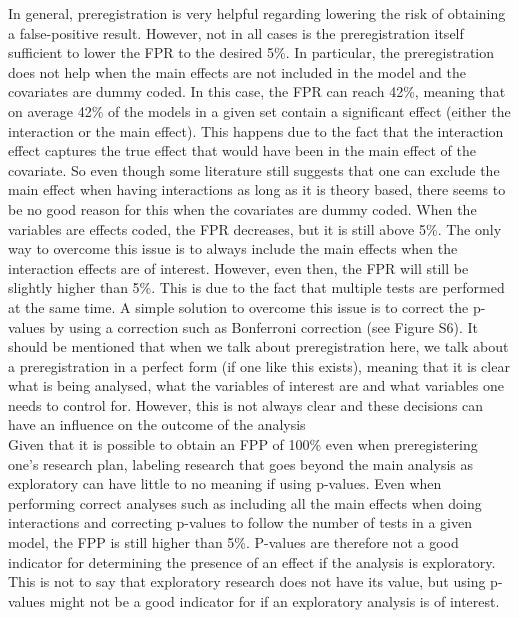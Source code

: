 In general, preregistration is very helpful regarding lowering the risk of obtaining a false-positive result. However, not in all cases is the preregistration itself sufficient to lower the FPR to the desired 5\%. In particular, the preregistration does not help when the main effects are not included in the model and the covariates are dummy coded. In this case, the FPR can reach 42\%, meaning that on average 42\% of the models in a given set contain a significant effect (either the interaction or the main effect). This happens due to the fact that the interaction effect captures the true effect that would have been in the main effect of the covariate. So even though some literature still suggests that one can exclude the main effect when having interactions as long as it is theory based, there seems to be no good reason for this when the covariates are dummy coded. When the variables are effects coded, the FPR decreases, but it is still above 5\%. The only way to overcome this issue is to always include the main effects when the interaction effects are of interest. However, even then, the FPR will still be slightly higher than 5\%. This is due to the fact that multiple tests are performed at the same time. A simple solution to overcome this issue is to correct the p-values by  using a correction such as Bonferroni correction \citep{dunn1961multiple} (see Figure S6).
It should be mentioned that when we talk about preregistration here, we talk about a preregistration in a perfect form (if one like this exists), meaning that it is clear what is being analysed, what the variables of interest are and what variables one needs to control for. However, this is not always clear and these decisions can have an influence on the outcome of the analysis \citep{Bryan25535,gilbert2016comment} \\

Given that it is possible to obtain an FPP of 100\% even when preregistering one's research plan, labeling research that goes beyond the main analysis as exploratory can have little to no meaning if using p-values. Even when performing correct analyses such as including all the main effects when doing interactions and correcting p-values to follow the number of tests in a given model, the FPP is still higher than 5\%. P-values are therefore not a good indicator for determining the presence of an effect if the analysis is exploratory. This is not to say that exploratory research does not have its value, but using p-values might not be a good indicator for if an exploratory analysis is of interest. \\
    
